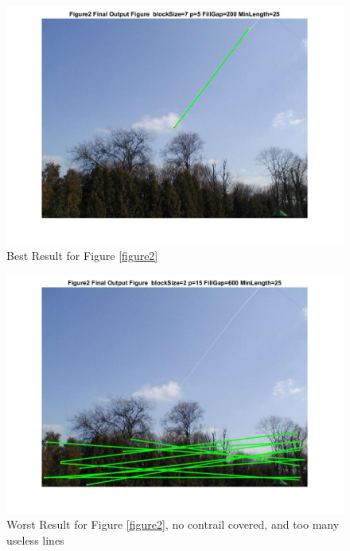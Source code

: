 \begin{figure}[hbtp]
	\centering
	\includegraphics[width=6in]{pic/Figure2_best.jpg}
	\caption{Best Result for Figure \ref{figure2}}
	\label{Figure2_best}
\end{figure}


\begin{figure}[hbtp]
	\centering
	\includegraphics[width=6in]{pic/Figure2_worst.jpg}
	\caption{Worst Result for Figure \ref{figure2}, no contrail covered, and too many useless lines}
	\label{Figure2_worst}
\end{figure}


